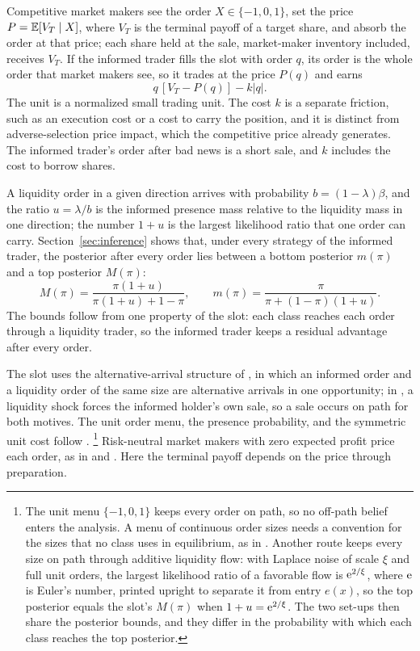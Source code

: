 Competitive market makers see the order \(X\in\{-1,0,1\}\), set the price \(P=\mathbb{E}[V_T\mid X]\), where
\(V_T\) is the terminal payoff of a target share, and absorb the order at that price; each share held at the
sale, market-maker inventory included, receives \(V_T\). If the informed trader fills the slot with order \(q\),
its order is the whole order that market makers see, so it trades at the price \(P(q)\) and earns
\begin{equation}\label{eq:profit}
q\,[V_T-P(q)]-k|q|.
\end{equation}
The unit is a normalized small trading unit. The cost \(k\) is a separate friction, such as an execution
cost or a cost to carry the position, and it is distinct from adverse-selection price impact, which the
competitive price already generates. The informed trader's order after bad news is a short sale, and \(k\) includes
the cost to borrow shares.

A liquidity order in a given direction arrives with probability \(b=(1-\lambda)\beta\), and the ratio
\(u=\lambda/b\) is the informed presence mass relative to the liquidity mass in one direction; the number
\(1+u\) is the largest likelihood ratio that one order can carry. Section~\ref{sec:inference} shows that,
under every strategy of the informed trader, the posterior after every order lies between a bottom posterior \(m(\pi)\)
and a top posterior \(M(\pi)\):
\begin{equation}\label{eq:bounds}
M(\pi)=\frac{\pi(1+u)}{\pi(1+u)+1-\pi},\qquad
m(\pi)=\frac{\pi}{\pi+(1-\pi)(1+u)}.
\end{equation}
The bounds follow from one property of the slot: each class reaches each order through a liquidity trader,
so the informed trader keeps a residual advantage after every order.

The slot uses the alternative-arrival structure of \citet{DowGorton1997}, in which an informed order and a
liquidity order of the same size are alternative arrivals in one opportunity; in
\citet{AdmatiPfleiderer2009}, a liquidity shock forces the informed holder's own sale, so a sale occurs on
path for both motives. The unit order menu, the presence probability, and the symmetric unit cost follow
\citet{EdmansGoldsteinJiang2015}.%
\footnote{The unit menu \(\{-1,0,1\}\) keeps every order on path, so no off-path belief enters the analysis.
A menu of continuous order sizes needs a convention for the sizes that no class uses in equilibrium, as in
\citet{EdmansGoldsteinJiang2015}. Another route keeps every size on path through additive liquidity flow:
with Laplace noise of scale \(\xi\) and full unit orders, the largest likelihood ratio of a favorable flow is
\(\mathrm{e}^{2/\xi}\), where \(\mathrm{e}\) is Euler's number, printed upright to separate it from entry \(e(x)\), so the top
posterior equals the slot's \(M(\pi)\) when \(1+u=\mathrm{e}^{2/\xi}\). The two set-ups then share the posterior bounds, and they differ in the probability with
which each class reaches the top posterior.}
Risk-neutral market makers with zero expected profit price each order, as in \citet{GlostenMilgrom1985} and
\citet{Kyle1985}. Here the terminal payoff depends on the price through preparation.

